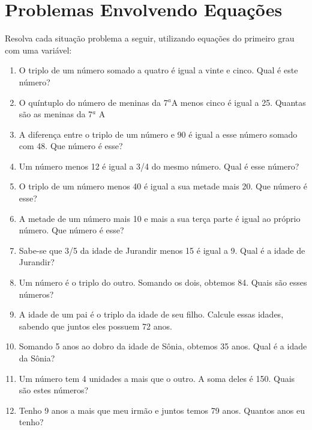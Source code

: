 		\section{Problemas Envolvendo Equações}
			
				\item Resolva cada situação problema a seguir, utilizando equações do primeiro grau com uma variável:
					\begin{enumerate}
						\item O triplo de um número somado a quatro é igual a vinte e cinco. Qual é este número?
						\item O quíntuplo do número de meninas da 7$^{a}$A menos cinco é igual a 25. Quantas são as meninas da 7$^{a}$ A

						\item A diferença entre o triplo de um número e 90 é igual a esse número somado com 48. Que número é esse?

						\item Um número menos 12 é igual a 3/4 do mesmo número. Qual é esse número?

						\item O triplo de um número menos 40 é igual a sua metade mais 20. Que número é esse?

						\item A metade de um número mais 10 e mais a sua terça parte é igual ao próprio número. Que número é esse?

						\item Sabe-se que 3/5 da idade de Jurandir menos 15 é igual a 9. Qual é a idade de Jurandir?

						\item Um número é o triplo do outro. Somando os dois, obtemos 84. Quais são esses números?

						\item A idade de um pai é o triplo da idade de seu filho. Calcule essas idades, sabendo que juntos eles possuem 72 anos.

						\item Somando 5 anos ao dobro da idade de Sônia, obtemos 35 anos. Qual é a idade da Sônia?						

						\item Um número tem 4 unidades a mais que o outro. A soma deles é 150. Quais são estes números?						

						\item Tenho 9 anos a mais que meu irmão e juntos temos 79 anos. Quantos anos eu tenho?


\end{enumerate}
